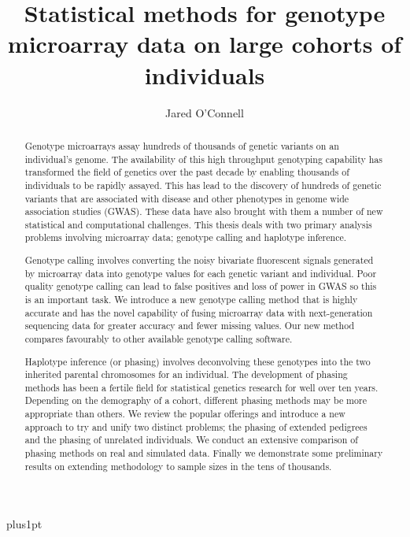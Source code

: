 \documentclass[twoside,openright,12pt]{ociamthesis}  %
\title{Statistical methods for genotype microarray data  on large cohorts of individuals}
\author{Jared O'Connell}             %
\begin{document}
\baselineskip=18pt plus1pt

\setcounter{secnumdepth}{3}
\setcounter{tocdepth}{3}


\maketitle                  %

\begin{abstract}
Genotype microarrays assay hundreds of thousands of genetic variants on an individual's genome. The availability of this high throughput genotyping capability has transformed the field of genetics over the past decade by enabling thousands of individuals to be rapidly assayed.  This has lead to  the discovery of hundreds of genetic variants that are associated with disease and other phenotypes in genome wide association studies (GWAS).  These data have also brought with them a number of new statistical and computational challenges.  This thesis deals with two primary analysis problems involving microarray data; genotype calling and haplotype inference.

Genotype calling involves converting the noisy bivariate fluorescent signals generated by microarray data into genotype values for each genetic variant and individual.  Poor quality genotype calling can lead to false positives and loss of power in GWAS so this is an important task.  We introduce a new genotype calling method that is highly accurate and has the novel capability of fusing microarray data with next-generation sequencing data for greater accuracy and fewer missing values. Our new method compares favourably to other available genotype calling software.

Haplotype inference (or phasing) involves deconvolving these genotypes into the two inherited parental chromosomes for an individual.  The development of phasing methods has been a fertile field for statistical genetics research for well over ten years. Depending on the demography of a cohort, different phasing methods may be more appropriate than others.  We review the popular offerings and introduce a new approach to try and unify two distinct problems; the phasing of extended pedigrees and the phasing of unrelated individuals.  We conduct an extensive   comparison of phasing methods on real and simulated data.  Finally we demonstrate some preliminary results on extending methodology to sample sizes in the tens of thousands.

\end{abstract}
\end{document}
